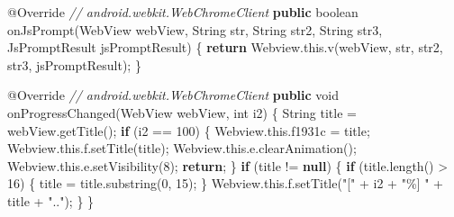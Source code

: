 \documentclass[
]{article}
\newenvironment{Shaded}{}{}
\newcommand{\AttributeTok}[1]{\textcolor[rgb]{0.49,0.56,0.16}{#1}}
\newcommand{\BuiltInTok}[1]{\textcolor[rgb]{0.00,0.50,0.00}{#1}}
\newcommand{\CommentTok}[1]{\textcolor[rgb]{0.38,0.63,0.69}{\textit{#1}}}
\newcommand{\ControlFlowTok}[1]{\textcolor[rgb]{0.00,0.44,0.13}{\textbf{#1}}}
\newcommand{\DataTypeTok}[1]{\textcolor[rgb]{0.56,0.13,0.00}{#1}}
\newcommand{\DecValTok}[1]{\textcolor[rgb]{0.25,0.63,0.44}{#1}}
\newcommand{\FunctionTok}[1]{\textcolor[rgb]{0.02,0.16,0.49}{#1}}
\newcommand{\KeywordTok}[1]{\textcolor[rgb]{0.00,0.44,0.13}{\textbf{#1}}}
\newcommand{\NormalTok}[1]{#1}
\newcommand{\OperatorTok}[1]{\textcolor[rgb]{0.40,0.40,0.40}{#1}}
\newcommand{\StringTok}[1]{\textcolor[rgb]{0.25,0.44,0.63}{#1}}
\begin{document}
\begin{Shaded}
\begin{Highlighting}[]
        \AttributeTok{@Override} \CommentTok{// android.webkit.WebChromeClient}
        \KeywordTok{public} \DataTypeTok{boolean} \FunctionTok{onJsPrompt}\OperatorTok{(}\NormalTok{WebView webView}\OperatorTok{,} \BuiltInTok{String}\NormalTok{ str}\OperatorTok{,} \BuiltInTok{String}\NormalTok{ str2}\OperatorTok{,} \BuiltInTok{String}\NormalTok{ str3}\OperatorTok{,}\NormalTok{ JsPromptResult jsPromptResult}\OperatorTok{)} \OperatorTok{\{}
            \ControlFlowTok{return}\NormalTok{ Webview}\OperatorTok{.}\FunctionTok{this}\OperatorTok{.}\FunctionTok{v}\OperatorTok{(}\NormalTok{webView}\OperatorTok{,}\NormalTok{ str}\OperatorTok{,}\NormalTok{ str2}\OperatorTok{,}\NormalTok{ str3}\OperatorTok{,}\NormalTok{ jsPromptResult}\OperatorTok{);}
        \OperatorTok{\}}

        \AttributeTok{@Override} \CommentTok{// android.webkit.WebChromeClient}
        \KeywordTok{public} \DataTypeTok{void} \FunctionTok{onProgressChanged}\OperatorTok{(}\NormalTok{WebView webView}\OperatorTok{,} \DataTypeTok{int}\NormalTok{ i2}\OperatorTok{)} \OperatorTok{\{}
            \BuiltInTok{String}\NormalTok{ title }\OperatorTok{=}\NormalTok{ webView}\OperatorTok{.}\FunctionTok{getTitle}\OperatorTok{();}
            \ControlFlowTok{if} \OperatorTok{(}\NormalTok{i2 }\OperatorTok{==} \DecValTok{100}\OperatorTok{)} \OperatorTok{\{}
\NormalTok{                Webview}\OperatorTok{.}\FunctionTok{this}\OperatorTok{.}\FunctionTok{f1931c} \OperatorTok{=}\NormalTok{ title}\OperatorTok{;}
\NormalTok{                Webview}\OperatorTok{.}\FunctionTok{this}\OperatorTok{.}\FunctionTok{f}\OperatorTok{.}\FunctionTok{setTitle}\OperatorTok{(}\NormalTok{title}\OperatorTok{);}
\NormalTok{                Webview}\OperatorTok{.}\FunctionTok{this}\OperatorTok{.}\FunctionTok{e}\OperatorTok{.}\FunctionTok{clearAnimation}\OperatorTok{();}
\NormalTok{                Webview}\OperatorTok{.}\FunctionTok{this}\OperatorTok{.}\FunctionTok{e}\OperatorTok{.}\FunctionTok{setVisibility}\OperatorTok{(}\DecValTok{8}\OperatorTok{);}
                \ControlFlowTok{return}\OperatorTok{;}
            \OperatorTok{\}}
            \ControlFlowTok{if} \OperatorTok{(}\NormalTok{title }\OperatorTok{!=} \KeywordTok{null}\OperatorTok{)} \OperatorTok{\{}
                \ControlFlowTok{if} \OperatorTok{(}\NormalTok{title}\OperatorTok{.}\FunctionTok{length}\OperatorTok{()} \OperatorTok{\textgreater{}} \DecValTok{16}\OperatorTok{)} \OperatorTok{\{}
\NormalTok{                    title }\OperatorTok{=}\NormalTok{ title}\OperatorTok{.}\FunctionTok{substring}\OperatorTok{(}\DecValTok{0}\OperatorTok{,} \DecValTok{15}\OperatorTok{);}
                \OperatorTok{\}}
\NormalTok{                Webview}\OperatorTok{.}\FunctionTok{this}\OperatorTok{.}\FunctionTok{f}\OperatorTok{.}\FunctionTok{setTitle}\OperatorTok{(}\StringTok{"["} \OperatorTok{+}\NormalTok{ i2 }\OperatorTok{+} \StringTok{"\%] "} \OperatorTok{+}\NormalTok{ title }\OperatorTok{+} \StringTok{".."}\OperatorTok{);}
            \OperatorTok{\}}
        \OperatorTok{\}}


\end{Highlighting}
\end{Shaded}
\end{document}
